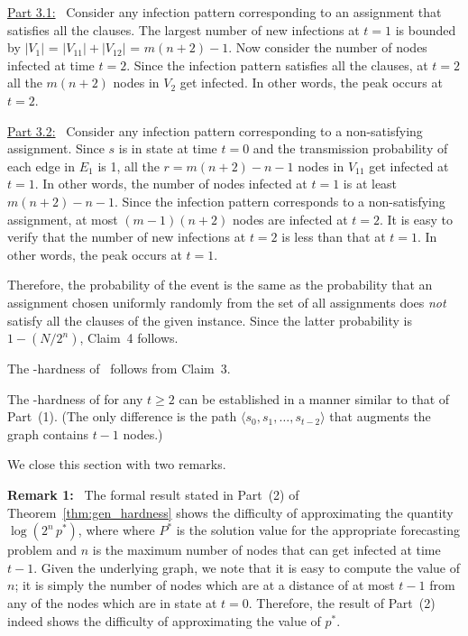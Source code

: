 \noindent
\underline{Part 3.1:}~ Consider any infection pattern corresponding
to an assignment that satisfies all the clauses.
The largest number of new infections at $t = 1$ is bounded by $|V_1|$
= $|V_{11}| + |V_{12}|$ = $m(n+2)-1$.
Now consider the number of nodes infected at time $t = 2$.
Since the infection pattern satisfies all the clauses, at $t = 2$
all the $m(n+2)$ nodes in $V_2$ get infected.
In other words, the peak occurs at $t = 2$. 

\medskip
\noindent
\underline{Part 3.2:}~ Consider any infection pattern corresponding
to a non-satisfying assignment.
Since $s$ is in state \istate{} at time $t = 0$ and the
transmission probability of each edge in $E_1$ is 1,
all the $r = m(n+2)-n-1$ nodes in $V_{11}$ get infected at $t = 1$.
In other words, the number of nodes infected at $t = 1$ is
at least $m(n+2)-n-1$.
Since the infection pattern corresponds to a non-satisfying
assignment, at most $(m-1)(n+2)$ nodes are infected at $t = 2$.
It is easy to verify that the number of new infections at $t = 2$ is
less than that at $t = 1$.
In other words, the peak occurs at $t = 1$.

Therefore, the probability of the event \cale{} is the same as
the probability that an assignment chosen uniformly randomly from
the set of all assignments does \emph{not} satisfy 
all the clauses of the given \mtsat{} instance.
Since the latter probability is $1-(N/2^n)$, Claim~4 follows. 

The \cnump-hardness of \OnePeak{} ~follows from Claim~3.

The \cnump-hardness of \tPeak{} for any $t \geq 2$ can be 
established in a manner similar to that of Part~(1). 
(The only difference is the path $\langle s_0, s_1, \ldots, s_{t-2}\rangle$
that augments the graph contains $t-1$ nodes.)
\QED

We close this section with two remarks.

\medskip

\noindent
\textbf{Remark 1:}~
The formal result stated in Part~(2) of 
Theorem~\ref{thm:gen_hardness} shows the difficulty of 
approximating the quantity $\log(2^n\,p^*)$, where
where $P^*$ is the solution value for the appropriate forecasting
problem and $n$ is the maximum number of nodes that 
can get infected at time $t-1$.
Given the underlying graph, we note that it is easy to compute the
value of $n$; it is simply the number of nodes which are at a
distance of at most $t-1$ from
any of the nodes which are in state \istate{} at $t = 0$.
Therefore, the result of Part~(2) indeed shows the difficulty 
of approximating the value of $p^*$. 

